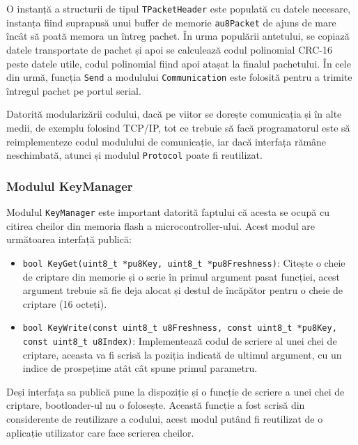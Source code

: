 \documentclass[12pt,a4paper,titlepage]{report}
\begin{document}
O instanță a structurii de tipul \texttt{TPacketHeader} este populată cu datele necesare, instanța fiind suprapusă unui buffer de memorie \texttt{au8Packet} de ajuns de mare încât să poată memora un întreg pachet. În urma populării antetului, se copiază datele transportate de pachet și apoi se calculează codul polinomial CRC-16 peste datele utile, codul polinomial fiind apoi atașat la finalul pachetului. În cele din urmă, funcția \texttt{Send} a modulului \texttt{Communication} este folosită pentru a trimite întregul pachet pe portul serial.

Datorită modularizării codului, dacă pe viitor se dorește comunicația și în alte medii, de exemplu folosind TCP/IP, tot ce trebuie să facă programatorul este să reimplementeze codul modulului de comunicație, iar dacă interfața rămâne neschimbată, atunci și modulul \texttt{Protocol} poate fi reutilizat.

\subsubsection{Modulul KeyManager}

Modulul \texttt{KeyManager} este important datorită faptului că acesta se ocupă cu citirea cheilor din memoria flash a  microcontroller-ului. Acest modul are următoarea interfață publică:

\begin{itemize}
\item \texttt{bool KeyGet(uint8\_t *pu8Key, uint8\_t *pu8Freshness)}: Citește o cheie de criptare din memorie și o scrie în primul argument pasat funcției, acest argument trebuie să fie deja alocat și destul de încăpător pentru o cheie de criptare (16 octeți).
\item \texttt{bool KeyWrite(const uint8\_t u8Freshness, const uint8\_t *pu8Key, const uint8\_t u8Index)}: Implementează codul de scriere al unei chei de criptare, aceasta va fi scrisă la poziția indicată de ultimul argument, cu un indice de prospețime atât cât spune primul parametru.
\end{itemize}

Deși interfața sa publică pune la dispoziție și o funcție de scriere a unei chei de criptare, bootloader-ul nu o folosește. Această funcție a fost scrisă din considerente de reutilizare a codului, acest modul putând fi reutilizat de o aplicație utilizator care face scrierea cheilor.
\end{document}
